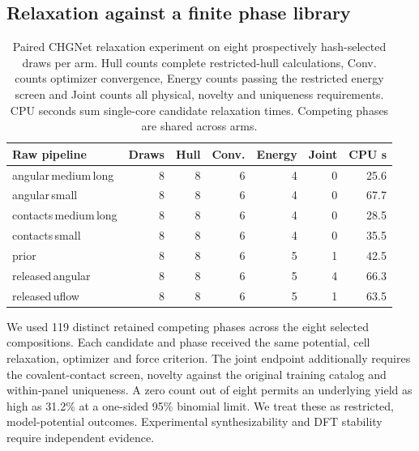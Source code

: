 \subsection{Relaxation against a finite phase library}

\begin{table}[!htbp]\centering\small\setlength{\tabcolsep}{3.6pt}
\caption{Paired CHGNet relaxation experiment on eight prospectively hash-selected draws per arm. Hull counts complete restricted-hull calculations, Conv. counts optimizer convergence, Energy counts passing the restricted energy screen and Joint counts all physical, novelty and uniqueness requirements. CPU seconds sum single-core candidate relaxation times. Competing phases are shared across arms.}\label{tab:hull}
\begin{tabular}{lrrrrrr}\hline
Raw pipeline & Draws & Hull & Conv. & Energy & Joint & CPU s\\\hline
angular\,medium\,long & 8 & 8 & 6 & 4 & 0 & 25.6\\
angular\,small & 8 & 8 & 6 & 4 & 0 & 67.7\\
contacts\,medium\,long & 8 & 8 & 6 & 4 & 0 & 28.5\\
contacts\,small & 8 & 8 & 6 & 4 & 0 & 35.5\\
prior & 8 & 8 & 6 & 5 & 1 & 42.5\\
released\,angular & 8 & 8 & 6 & 5 & 4 & 66.3\\
released\,uflow & 8 & 8 & 6 & 5 & 1 & 63.5\\
\hline\end{tabular}\end{table}

We used 119 distinct retained competing phases across the eight selected compositions. Each candidate and phase received the same potential, cell relaxation, optimizer and force criterion. The joint endpoint additionally requires the covalent-contact screen, novelty against the original training catalog and within-panel uniqueness. A zero count out of eight permits an underlying yield as high as 31.2\% at a one-sided 95\% binomial limit. We treat these as restricted, model-potential outcomes. Experimental synthesizability and DFT stability require independent evidence.


